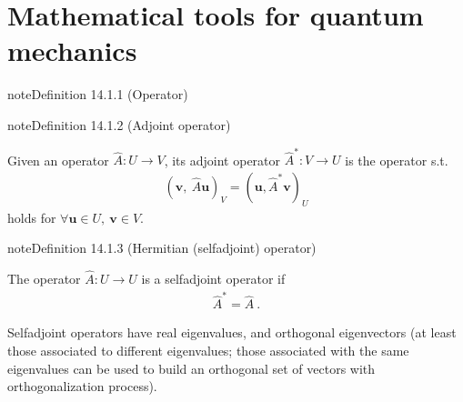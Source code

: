 \documentclass[letterpaper,10pt,english]{jupyterBook}
\begin{document}
\section{Mathematical tools for quantum mechanics}
\label{\detokenize{ch/quantum-mechanics/intro:mathematical-tools-for-quantum-mechanics}}\label{\detokenize{ch/quantum-mechanics/intro:quantum-mechanics-intro-math}}\label{ch/quantum-mechanics/intro:Operator}
\begin{sphinxadmonition}{note}{Definition 14.1.1 (Operator)}


\end{sphinxadmonition}
\label{ch/quantum-mechanics/intro:Adjoint Operator}
\begin{sphinxadmonition}{note}{Definition 14.1.2 (Adjoint operator)}



\sphinxAtStartPar
Given an operator \(\hat{A}: U \rightarrow V\), its adjoint operator \(\hat{A}^*: V \rightarrow U\) is the operator s.t.
\begin{equation*}
\begin{split}(\mathbf{v}, \ \hat{A} \mathbf{u})_{V} = (\mathbf{u}, \hat{A}^* \mathbf{v} )_{U}\end{split}
\end{equation*}
\sphinxAtStartPar
holds for \(\forall \mathbf{u} \in U, \ \mathbf{v} \in V\).
\end{sphinxadmonition}
\label{ch/quantum-mechanics/intro:Self-Adjoint Operator}
\begin{sphinxadmonition}{note}{Definition 14.1.3 (Hermitian (self\sphinxhyphen{}adjoint) operator)}



\sphinxAtStartPar
The operator \(\hat{A}: U \rightarrow U\) is a self\sphinxhyphen{}adjoint operator if
\begin{equation*}
\begin{split}\hat{A}^* = \hat{A} \ .\end{split}
\end{equation*}\end{sphinxadmonition}

\sphinxAtStartPar
Self\sphinxhyphen{}adjoint operators have real eigenvalues, and orthogonal eigenvectors (at least those associated to different eigenvalues; those associated with the same eigenvalues can be used to build an orthogonal set of vectors with orthogonalization process).
\end{document}
